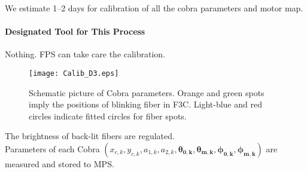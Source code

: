 We estimate 1--2 days for calibration of all the cobra parameters and motor map.


\paragraph{Designated Tool for This Process}
Nothing. FPS can take care the calibration.

\begin{figure}[!ht]
\begin{center}
\texttt{[image: Calib\_D3.eps]}
\end{center}
\caption{Schematic picture of Cobra parameters.
Orange and green spots imply the positions of blinking fiber in F3C.
Light-blue and red circles indicate fitted circles for fiber spots.
}
\label{fig:Cobraparams}
\end{figure}


\begin{itembox}[l]{}
The brightness of back-lit fibers are regulated. \\
Parameters of each Cobra $(x_{c,k}, y_{c,k}, a_{1,k}, a_{2,k}, \bm{\theta _{0,k}}, \bm{\theta _{m,k}}, \bm{\phi _{0,k}}, \bm{\phi _{m,k}})$ are measured and stored to MPS.

\end{itembox}